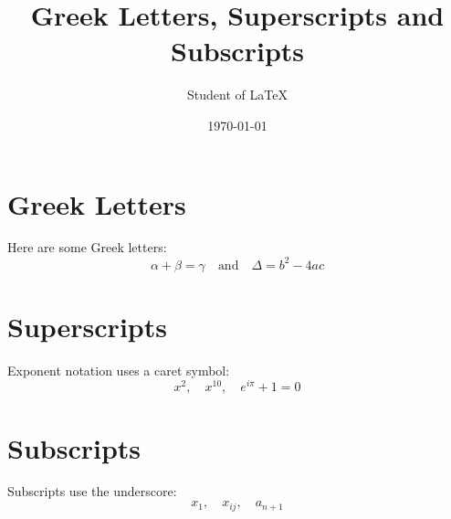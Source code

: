 \documentclass{article}
\title{Greek Letters, Superscripts and Subscripts}
\author{Student of LaTeX}
\date{\today}
\begin{document}
\maketitle

\section{Greek Letters}
Here are some Greek letters:
\[
\alpha + \beta = \gamma \quad \text{and} \quad \Delta = b^2 - 4ac
\]

\section{Superscripts}
Exponent notation uses a caret symbol:
\[
x^2, \quad x^{10}, \quad e^{i\pi} + 1 = 0
\]

\section{Subscripts}
Subscripts use the underscore:
\[
x_1, \quad x_{ij}, \quad a_{n+1}
\]
\end{document}
